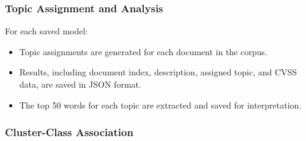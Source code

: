 \documentclass[12pt]{article}
\begin{document}




\subsubsection*{Topic Assignment and Analysis}

For each saved model:

\begin{itemize}

	\item Topic assignments are generated for each document in the corpus.

	\item Results, including document index, description, assigned topic, and CVSS data, are saved
	      in JSON format.

	\item The top 50 words for each topic are extracted and saved for interpretation.

\end{itemize}








\subsubsection*{Cluster-Class Association}
\end{document}
